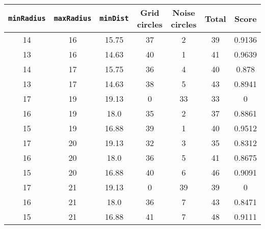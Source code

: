 \documentclass[letterpaper, 12pt]{article}
\begin{document}
\begin{longtable}{|c|c|c|c|c|c|c|}
\hline
\textbf{\texttt{minRadius}} & \textbf{\texttt{maxRadius}} & \textbf{\texttt{minDist}} & \textbf{Grid circles} & \textbf{Noise circles} & \textbf{Total} & \textbf{Score} \\
\hline
14 & 16 & 15.75 & 37 & 2 & 39 & 0.9136 \\
\hline
13 & 16 & 14.63 & 40 & 1 & 41 & 0.9639 \\
\hline
14 & 17 & 15.75 & 36 & 4 & 40 & 0.878 \\
\hline
13 & 17 & 14.63 & 38 & 5 & 43 & 0.8941 \\
\hline
17 & 19 & 19.13 & 0 & 33 & 33 & 0 \\
\hline
16 & 19 & 18.0 & 35 & 2 & 37 & 0.8861 \\
\hline
15 & 19 & 16.88 & 39 & 1 & 40 & 0.9512 \\
\hline
17 & 20 & 19.13 & 32 & 3 & 35 & 0.8312 \\
\hline
16 & 20 & 18.0 & 36 & 5 & 41 & 0.8675 \\
\hline
15 & 20 & 16.88 & 40 & 6 & 46 & 0.9091 \\
\hline
17 & 21 & 19.13 & 0 & 39 & 39 & 0 \\
\hline
16 & 21 & 18.0 & 36 & 7 & 43 & 0.8471 \\
\hline
15 & 21 & 16.88 & 41 & 7 & 48 & 0.9111 \\
\hline
\end{longtable}
\end{document}
